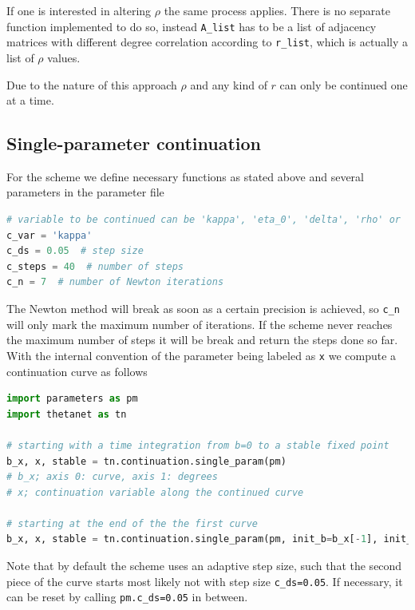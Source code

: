 \documentclass[bibliography=totoc, twoside]{article}
\numberwithin{equation}{section}
\begin{document}
If one is interested in altering $\rho$ the same process applies.
There is no separate function implemented to do so, instead \texttt{A\_list} has to be a list of adjacency matrices with different degree correlation according to \texttt{r\_list}, which is actually a list of $\rho$ values.

Due to the nature of this approach $\rho$ and any kind of $r$ can only be continued one at a time.


\subsection{Single-parameter continuation}
For the scheme we define necessary functions as stated above and several parameters in the parameter file
\begin{lstlisting}[language=python]
# variable to be continued can be 'kappa', 'eta_0', 'delta', 'rho' or 'r'
c_var = 'kappa'
c_ds = 0.05  # step size
c_steps = 40  # number of steps
c_n = 7  # number of Newton iterations
\end{lstlisting}
The Newton method will break as soon as a certain precision is achieved, so \texttt{c\_n} will only mark the maximum number of iterations.
If the scheme never reaches the maximum number of steps it will be break and return the steps done so far.
With the internal convention of the parameter being labeled as \texttt{x} we compute a continuation curve as follows
\begin{lstlisting}[language=python]
import parameters as pm
import thetanet as tn

# starting with a time integration from b=0 to a stable fixed point
b_x, x, stable = tn.continuation.single_param(pm)
# b_x; axis 0: curve, axis 1: degrees
# x; continuation variable along the continued curve

# starting at the end of the the first curve
b_x, x, stable = tn.continuation.single_param(pm, init_b=b_x[-1], init_x=x[-1], init_stability=stable[-1])
\end{lstlisting}
Note that by default the scheme uses an adaptive step size, such that the second piece of the curve starts most likely not with step size \texttt{c\_ds=0.05}.
If necessary, it can be reset by calling \texttt{pm.c\_ds=0.05} in between.
\end{document}
